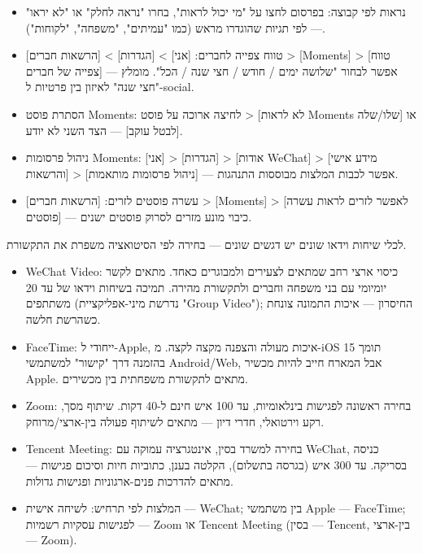 
\begin{itemize}
  \item נראות לפי קבוצה: בפרסום לחצו על "מי יכול לראות", בחרו "נראה לחלק" או "לא יראו" — לפי תגיות שהוגדרו מראש (כמו "עמיתים", "משפחה", "לקוחות").
  \item טווח צפייה לחברים: [אני] > [הגדרות] > [הרשאות חברים] > [Moments] > [טווח צפייה של חברים] — אפשר לבחור "שלושה ימים / חודש / חצי שנה / הכל". מומלץ "חצי שנה" לאיזון בין פרטיות ל-social.
  \item הסתרת פוסט Moments: לחיצה ארוכה על פוסט > [לא לראות Moments שלו/שלה] או [לבטל עוקב] — הצד השני לא יודע.
  \item ניהול פרסומות Moments: [אני] > [הגדרות] > [אודות WeChat] > [מידע אישי והרשאות] > [ניהול פרסומות מותאמות] — אפשר לכבות המלצות מבוססות התנהגות.
  \item עשרה פוסטים לזרים: [הרשאות חברים] > [Moments] > [לאפשר לזרים לראות עשרה פוסטים] — כיבוי מונע מזרים לסרוק פוסטים ישנים.
\end{itemize}


לכלי שיחות וידאו שונים יש דגשים שונים — בחירה לפי הסיטואציה משפרת את התקשורת.

\begin{itemize}
  \item WeChat Video: כיסוי ארצי רחב שמתאים לצעירים ולמבוגרים כאחד. מתאים לקשר יומיומי עם בני משפחה וחברים ולתקשורת מהירה. תמיכה בשיחות וידאו של עד 20 משתתפים (נדרשת מיני-אפליקציית "Group Video"); החיסרון — איכות התמונה צונחת כשהרשת חלשה.
  \item FaceTime: ייחודי ל-Apple, איכות מעולה והצפנה מקצה לקצה. מ-iOS 15 תומך בהזמנה דרך "קישור" למשתמשי Android/Web, אבל המארח חייב להיות מכשיר Apple. מתאים לתקשורת משפחתית בין מכשירים.
  \item Zoom: בחירה ראשונה לפגישות בינלאומיות, עד 100 איש חינם ל-40 דקות. שיתוף מסך, רקע וירטואלי, חדרי דיון — מתאים לשיתוף פעולה בין-ארצי/מרוחק.
  \item Tencent Meeting: בחירה למשרד בסין, אינטגרציה עמוקה עם WeChat, כניסה בסריקה. עד 300 איש (בגרסה בתשלום), הקלטה בענן, כתוביות חיות וסיכום פגישות — מתאים להדרכות פנים-ארגוניות ופגישות גדולות.
  \item המלצות לפי תרחיש: לשיחה אישית — WeChat; בין משתמשי Apple — FaceTime; לפגישות עסקיות רשמיות — Zoom או Tencent Meeting (בסין — Tencent, בין-ארצי — Zoom).
\end{itemize}

